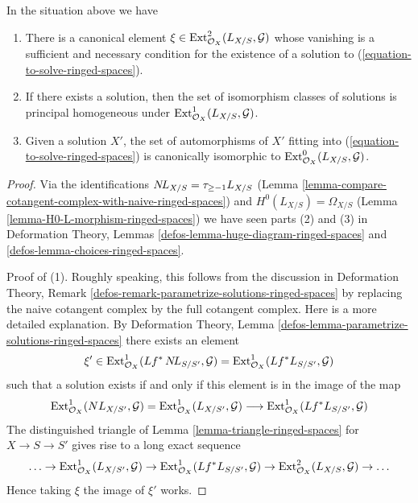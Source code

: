 \begin{lemma}
\label{lemma-find-obstruction-ringed-spaces}
In the situation above we have
\begin{enumerate}
\item There is a canonical element
$\xi \in \mathop{\mathrm{Ext}}\nolimits^2_{\mathcal{O}_X}(L_{X/S}, \mathcal{G})$
whose vanishing is a sufficient and necessary condition for the existence
of a solution to (\ref{equation-to-solve-ringed-spaces}).
\item If there exists a solution, then the set of
isomorphism classes of solutions is principal homogeneous under
$\mathop{\mathrm{Ext}}\nolimits^1_{\mathcal{O}_X}(L_{X/S}, \mathcal{G})$.
\item Given a solution $X'$, the set of automorphisms of $X'$
fitting into (\ref{equation-to-solve-ringed-spaces}) is canonically isomorphic
to $\mathop{\mathrm{Ext}}\nolimits^0_{\mathcal{O}_X}(L_{X/S}, \mathcal{G})$.
\end{enumerate}
\end{lemma}

\begin{proof}
Via the identifications $\mathop{N\!L}\nolimits_{X/S} = \tau_{\geq -1}L_{X/S}$
(Lemma \ref{lemma-compare-cotangent-complex-with-naive-ringed-spaces})
and
$H^0(L_{X/S}) = \Omega_{X/S}$
(Lemma \ref{lemma-H0-L-morphism-ringed-spaces})
we have seen parts (2) and (3) in
Deformation Theory, Lemmas \ref{defos-lemma-huge-diagram-ringed-spaces} and
\ref{defos-lemma-choices-ringed-spaces}.

\medskip\noindent
Proof of (1). Roughly speaking, this follows from the discussion in
Deformation Theory, Remark
\ref{defos-remark-parametrize-solutions-ringed-spaces}
by replacing the naive cotangent complex by the full cotangent complex.
Here is a more detailed explanation. By
Deformation Theory, Lemma \ref{defos-lemma-parametrize-solutions-ringed-spaces}
there exists an element
$$
\xi' \in
\mathop{\mathrm{Ext}}\nolimits^1_{\mathcal{O}_X}(Lf^*\mathop{N\!L}\nolimits_{S/S'}, \mathcal{G}) =
\mathop{\mathrm{Ext}}\nolimits^1_{\mathcal{O}_X}(Lf^*L_{S/S'}, \mathcal{G})
$$
such that a solution exists if and only if this element is in
the image of the map
$$
\mathop{\mathrm{Ext}}\nolimits^1_{\mathcal{O}_X}(NL_{X/S'}, \mathcal{G}) =
\mathop{\mathrm{Ext}}\nolimits^1_{\mathcal{O}_X}(L_{X/S'}, \mathcal{G})
\longrightarrow
\mathop{\mathrm{Ext}}\nolimits^1_{\mathcal{O}_X}(Lf^*L_{S/S'}, \mathcal{G})
$$
The distinguished triangle of Lemma \ref{lemma-triangle-ringed-spaces}
for $X \to S \to S'$ gives rise to a long exact sequence
$$
\ldots \to
\mathop{\mathrm{Ext}}\nolimits^1_{\mathcal{O}_X}(L_{X/S'}, \mathcal{G}) \to
\mathop{\mathrm{Ext}}\nolimits^1_{\mathcal{O}_X}(Lf^*L_{S/S'}, \mathcal{G}) \to
\mathop{\mathrm{Ext}}\nolimits^2_{\mathcal{O}_X}(L_{X/S}, \mathcal{G}) \to \ldots
$$
Hence taking $\xi$ the image of $\xi'$ works.
\end{proof}










